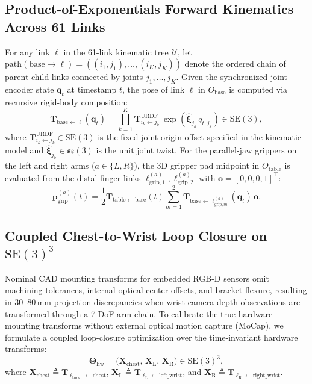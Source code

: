 \documentclass[10pt,journal]{IEEEtran}
\begin{document}
\subsection{Product-of-Exponentials Forward Kinematics Across 61 Links}
For any link $\ell$ in the 61-link kinematic tree $\mathcal{U}$, let $\mathrm{path}(\mathrm{base}\to\ell) = ((i_1, j_1), \dots, (i_K, j_K))$ denote the ordered chain of parent-child links connected by joints $j_1, \dots, j_K$. Given the synchronized joint encoder state $\mathbf{q}_t$ at timestamp $t$, the pose of link $\ell$ in $O_{\mathrm{base}}$ is computed via recursive rigid-body composition:
\begin{equation}
    \mathbf{T}_{\mathrm{base}\leftarrow \ell}(\mathbf{q}_t) = \prod_{k=1}^{K} \mathbf{T}_{i_k \leftarrow j_k}^{\mathrm{URDF}} \, \exp\!\left( \hat{\boldsymbol{\xi}}_{j_k} \, q_{t, j_k} \right) \in \mathrm{SE}(3),
    \label{eq:poe_fk}
\end{equation}
where $\mathbf{T}_{i_k \leftarrow j_k}^{\mathrm{URDF}} \in \mathrm{SE}(3)$ is the fixed joint origin offset specified in the kinematic model and $\hat{\boldsymbol{\xi}}_{j_k} \in \mathfrak{se}(3)$ is the unit joint twist. For the parallel-jaw grippers on the left and right arms ($a \in \{L, R\}$), the 3D gripper pad midpoint in $O_{\mathrm{table}}$ is evaluated from the distal finger links $\ell_{\mathrm{grip},1}^{(a)}, \ell_{\mathrm{grip},2}^{(a)}$ with $\mathbf{o} = [0,0,0,1]^\top$:
\begin{equation}
    \mathbf{p}_{\mathrm{grip}}^{(a)}(t) = \frac{1}{2} \mathbf{T}_{\mathrm{table}\leftarrow \mathrm{base}}(t) \sum_{m=1}^{2} \mathbf{T}_{\mathrm{base}\leftarrow \ell_{\mathrm{grip},m}^{(a)}}(\mathbf{q}_t)\,\mathbf{o}.
    \label{eq:gripper_mid}
\end{equation}

\subsection{Coupled Chest-to-Wrist Loop Closure on $\mathrm{SE}(3)^3$}
Nominal CAD mounting transforms for embedded RGB-D sensors omit machining tolerances, internal optical center offsets, and bracket flexure, resulting in $30$--$80\,\mathrm{mm}$ projection discrepancies when wrist-camera depth observations are transformed through a 7-DoF arm chain. To calibrate the true hardware mounting transforms without external optical motion capture (MoCap), we formulate a coupled loop-closure optimization over the time-invariant hardware transforms:
\begin{equation}
    \boldsymbol{\Theta}_{\mathrm{hw}} = \big( \mathbf{X}_{\mathrm{chest}},\, \mathbf{X}_{\mathrm{L}},\, \mathbf{X}_{\mathrm{R}} \big) \in \mathrm{SE}(3)^3,
    \label{eq:theta_hw}
\end{equation}
where $\mathbf{X}_{\mathrm{chest}} \triangleq \mathbf{T}_{\ell_{\mathrm{torso}}\leftarrow \mathrm{chest}}$, $\mathbf{X}_{\mathrm{L}} \triangleq \mathbf{T}_{\ell_{\mathrm{L}}\leftarrow \mathrm{left\_wrist}}$, and $\mathbf{X}_{\mathrm{R}} \triangleq \mathbf{T}_{\ell_{\mathrm{R}}\leftarrow \mathrm{right\_wrist}}$.
\end{document}
